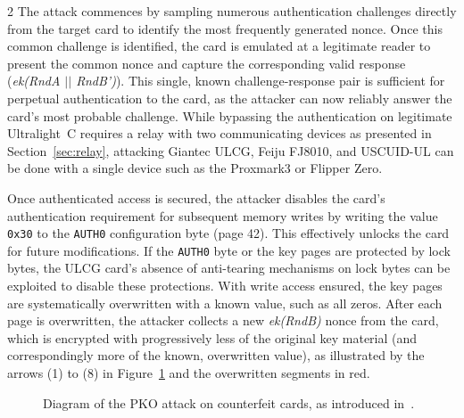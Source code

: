 \documentclass[10pt,letterpaper]{article}
\begin{document}
\begin{multicols}{2}
The attack commences by sampling numerous authentication challenges directly from the target card to identify the most frequently generated nonce. Once this common challenge is identified, the card is emulated at a legitimate reader to present the common nonce and capture the corresponding valid response (\textit{ek(RndA $||$ RndB')}). This single, known challenge-response pair is sufficient for perpetual authentication to the card, as the attacker can now reliably answer the card's most probable challenge. While bypassing the authentication on legitimate Ultralight~C requires a relay with two communicating devices as presented in Section~\ref{sec:relay}, attacking Giantec ULCG, Feiju FJ8010, and USCUID-UL can be done with a single device such as the Proxmark3 or Flipper Zero.

Once authenticated access is secured, the attacker disables the card's authentication requirement for subsequent memory writes by writing the value \texttt{0x30} to the \texttt{AUTH0} configuration byte (page 42). This effectively unlocks the card for future modifications. If the \texttt{AUTH0} byte or the key pages are protected by lock bytes, the ULCG card's absence of anti-tearing mechanisms on lock bytes can be exploited to disable these protections. With write access ensured, the key pages are systematically overwritten with a known value, such as all zeros. After each page is overwritten, the attacker collects a new \textit{ek(RndB)} nonce from the card, which is encrypted with progressively less of the original key material (and correspondingly more of the known, overwritten value), as illustrated by the arrows (1) to (8) in Figure~\ref{fig:pko} and the overwritten segments in red.

\begin{figure}[hb]
  \centering
  
  \caption{Diagram of the PKO attack on counterfeit cards, as introduced in~\cite{article3940}.}
  \label{fig:pko}
\end{figure}


\end{multicols}
\end{document}
